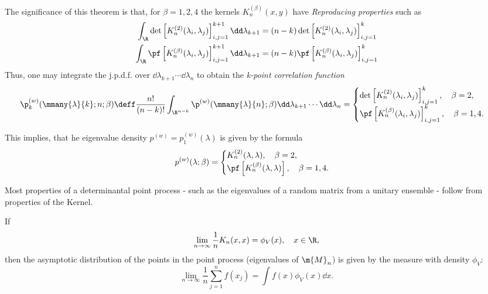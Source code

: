 The significance of this theorem is that, for $\beta = 1, 2, 4$ the kernels $K_n^{(\beta)}(x,y)$ have \textit{Reproducing properties} such as
\begin{align}
	\int_{\R} \det\left[ K_n^{(2)}(\lambda_i, \lambda_j) \right]_{i,j=1}^{k+1} \dd \lambda_{k+1} & = (n-k) \det\left[ K_n^{(2)}(\lambda_i, \lambda_j) \right]_{i,j=1}^{k} \\
	\int_{\R} \pf\left[ K_n^{(\beta)}(\lambda_i, \lambda_j) \right]_{i,j=1}^{k+1} \dd \lambda_{k+1} & = (n-k)  \pf\left[ K_n^{(\beta)}(\lambda_i, \lambda_j) \right]_{i,j=1}^{k}
	\label{Eq: Reproducibility}
\end{align}
Thus, one may integrate the j.p.d.f. over $\dd \lambda_{k+1} \cdots \dd \lambda_n$ to obtain the \textit{k-point correlation function}
\begin{equation}
	\p_k^{(w)}(\mmany{\lambda}{k};n;\beta) \deff \frac{n!}{(n-k)!} \int_{\R^{n-k}} \p^{(w)}(\mmany{\lambda}{n};\beta) \dd \lambda_{k+1} \cdots \dd \lambda_n \\
	=
	\begin{cases}
		\det\left[ K_n^{(2)}(\lambda_i, \lambda_j) \right]_{i,j=1}^{k}, \quad \beta = 2, \\
		\pf\left[ K_n^{(\beta)}(\lambda_i, \lambda_j) \right]_{i,j=1}^{k}, \quad \beta = 1,4.
	\end{cases}
\end{equation}

This implies, that he eigenvalue density $p^{(w)} = p_1^{(w)}(\lambda)$ is given by the formula
\begin{equation}
	p^{(w)}(\lambda; \beta) = 
	\begin{cases}
		K_n^{(2)}(\lambda, \lambda), \quad \beta = 2, \\
		\pf\left[ K_n^{(\beta)}(\lambda, \lambda) \right], \quad \beta = 1,4.
	\end{cases}
\end{equation}

Most properties of a determinantal point process - such as the eigenvalues of a random matrix from a unitary ensemble - follow from properties of the Kernel. 

\begin{teorema}
	If
	\begin{equation}
		\lim_{n \rightarrow \infty} \frac{1}{n} K_n(x,x) = \phi_V(x), \quad x \in \R,
	\end{equation}	
	then the asymptotic distribution of the points in the point process (eigenvalues of $\m{M}_n$) is given by the measure with density $\phi_V$:
	\begin{equation}
		\lim_{n \rightarrow \infty} \frac{1}{n} \sum_{j=1}^{n} f(x_j) = \int f(x) \phi_V(x) \dd x.
	\end{equation}
\end{teorema}

